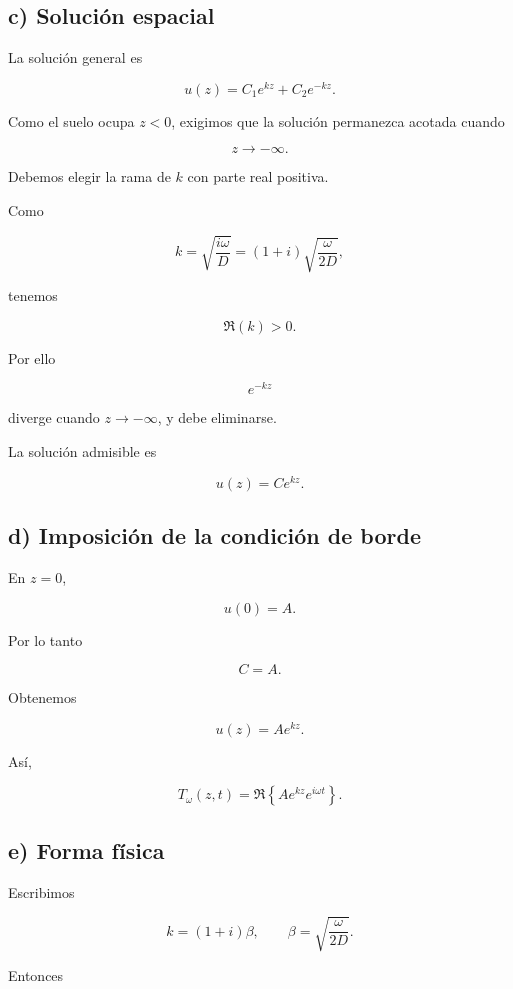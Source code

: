 \documentclass[11pt,spanish]{article}
\begin{document}
\subsection*{c) Solución espacial}

La solución general es

\[
u(z)=C_1e^{kz}+C_2e^{-kz}.
\]

Como el suelo ocupa \(z<0\), exigimos que la solución permanezca acotada cuando

\[
z\rightarrow -\infty.
\]

Debemos elegir la rama de \(k\) con parte real positiva.

Como

\[
k
=
\sqrt{\frac{i\omega}{D}}
=
(1+i)\sqrt{\frac{\omega}{2D}},
\]

tenemos

\[
\Re(k)>0.
\]

Por ello

\[
e^{-kz}
\]

diverge cuando \(z\to-\infty\), y debe eliminarse.

La solución admisible es

\[
u(z)=Ce^{kz}.
\]


\subsection*{d) Imposición de la condición de borde}

En \(z=0\),

\[
u(0)=A.
\]

Por lo tanto

\[
C=A.
\]

Obtenemos

\[
u(z)
=
A e^{kz}.
\]

Así,

\[
T_\omega(z,t)
=
\Re
\left\{
A e^{kz}e^{i\omega t}
\right\}.
\]


\subsection*{e) Forma física}

Escribimos

\[
k
=
(1+i)\beta,
\qquad
\beta
=
\sqrt{\frac{\omega}{2D}}.
\]

Entonces
\end{document}
